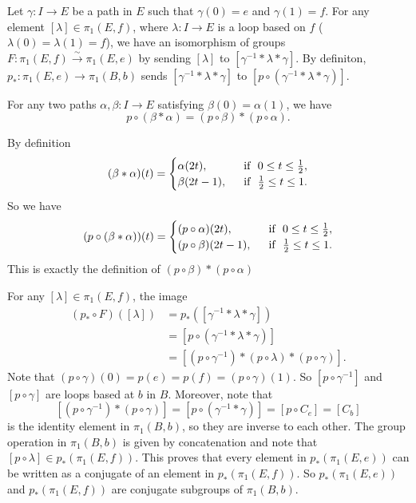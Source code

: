 \documentclass[letterpaper, 12pt]{article}
\begin{document}
\begin{solution}
Let \(\gamma:I\rightarrow E\) be a path in \(E\) such that \(\gamma(0)=e\) and \(\gamma(1)=f\). For any element \([\lambda]\in \pi_1(E,f)\), where \(\lambda:I\rightarrow E\) is a loop based on \(f\) (\(\lambda(0)=\lambda(1)=f\)), we have an isomorphism of groups 
\(F:\pi_1(E,f)\xrightarrow{\sim}\pi_1(E,e)\) by sending \([\lambda]\) to \([\gamma^{-1}*\lambda*\gamma]\). By definiton, \(p_*:\pi_1(E,e)\rightarrow \pi_1(B,b)\) sends \([\gamma^{-1}*\lambda*\gamma]\) to \([p\circ(\gamma^{-1}* \lambda*\gamma)]\). 
\begin{claim}
For any two paths \(\alpha,\beta:I\rightarrow E\) satisfying \(\beta(0)=\alpha(1)\), we have 
\[p\circ (\beta*\alpha)=(p\circ \beta)*(p\circ \alpha).\]
\end{claim}
\begin{claimproof}
By definition 
\[(\beta*\alpha)(t)=\begin{cases}
	\alpha(2t),&\ \ \text{if}\ \  0\leq t\leq \frac{1}{2},\\ 
	\beta(2t-1),&\ \ \text{if}\ \  \frac{1}{2}\leq t\leq 1.
\end{cases}\]
So we have 
\[(p\circ (\beta*\alpha))(t)=\begin{cases}
	(p\circ \alpha)(2t),&\ \ \text{if}\ \  0\leq t\leq \frac{1}{2},\\ 
	(p\circ \beta)(2t-1),&\ \ \text{if}\ \  \frac{1}{2}\leq t\leq 1.
\end{cases}\]
This is exactly the definition of \((p\circ \beta)*(p\circ \alpha)\)
\end{claimproof}

For any \([\lambda]\in \pi_1(E,f)\), the image 
\begin{align*}
(p_*\circ F)([\lambda])&=p_*([\gamma^{-1}*\lambda*\gamma])\\ 
                       &=[p\circ (\gamma^{-1}*\lambda*\gamma)]\\ 
					   &=[(p\circ \gamma^{-1})*(p\circ \lambda)*(p\circ \gamma)].
\end{align*}
Note that \((p\circ \gamma)(0)=p(e)=p(f)=(p\circ \gamma)(1)\). So \([p\circ \gamma^{-1}]\) and \([p\circ \gamma]\) are loops based at \(b\) in \(B\). Moreover, note that 
\[[(p\circ \gamma^{-1})*(p\circ \gamma)]=[p\circ (\gamma^{-1}*\gamma)]=[p\circ C_e]=[C_b]\]
is the identity element in \(\pi_1(B,b)\), so they are inverse to each other. The group operation in \(\pi_1(B,b)\) is given by concatenation and note that \([p\circ \lambda]\in p_*(\pi_1(E,f))\). This proves that every element 
in \(p_*(\pi_1(E,e))\) can be written as a conjugate of an element in \(p_*(\pi_1(E,f))\). So \(p_*(\pi_1(E,e))\) and \(p_*(\pi_1(E,f))\) are conjugate subgroups of \(\pi_1(B,b)\). 
\end{solution}
\end{document}
